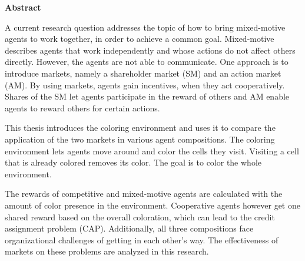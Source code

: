 \vspace*{2cm}

\begin{center}
    \textbf{Abstract}
\end{center}

\vspace*{1cm}

\noindent A current research question addresses the topic of how to bring mixed-motive agents to work together, in order to achieve a common goal. Mixed-motive describes agents that work independently and whose actions do not affect others directly. However, the agents are not able to communicate. One approach is to introduce markets, namely a shareholder market (SM) and an action market (AM). By using markets, agents gain incentives, when they act cooperatively. Shares of the SM let agents participate in the reward of others and AM enable agents to reward others for certain actions.

This thesis introduces the coloring environment and uses it to compare the application of the two markets in various agent compositions. The coloring environment lets agents move around and color the cells they visit. Visiting a cell that is already colored removes its color. The goal is to color the whole environment.

The rewards of competitive and mixed-motive agents are calculated with the amount of color presence in the environment. Cooperative agents however get one shared reward based on the overall coloration, which can lead to the credit assignment problem (CAP). Additionally, all three compositions face organizational challenges of getting in each other's way. The effectiveness of markets on these problems are analyzed in this research. 